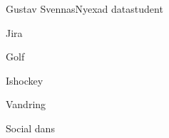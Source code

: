 \documentclass{article}
\begin{document}
\begin{cv}[avatar]{Gustav Svennas}{Nyexad datastudent}
\cvseparator
\begin{cvitem}
    Jira
\end{cvitem}






\cvseparator
\begin{cvitem}
    Golf
\end{cvitem}

\cvseparator
\begin{cvitem}
    Ishockey 
\end{cvitem}

\cvseparator
\begin{cvitem}
    Vandring
\end{cvitem}

\cvseparator
\begin{cvitem}
    Social dans
\end{cvitem}


\end{cv}
\end{document}
